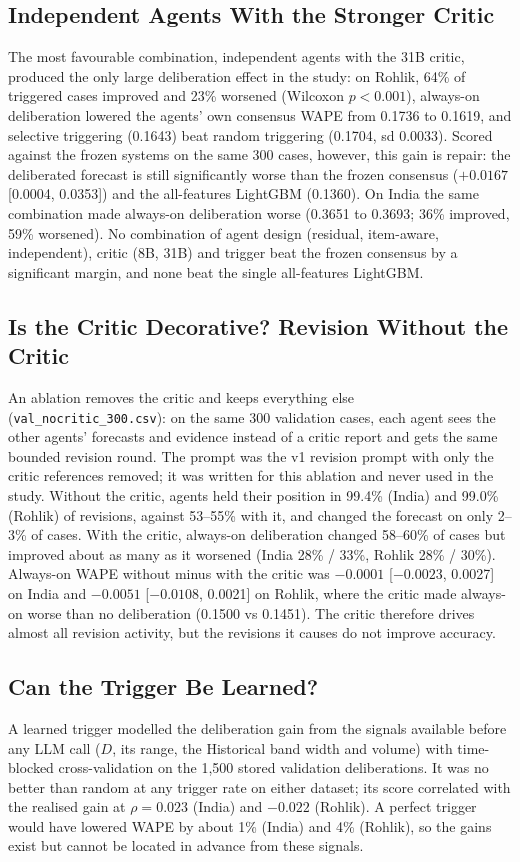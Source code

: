 \documentclass[conference]{IEEEtran}
\begin{document}
\subsection{Independent Agents With the Stronger Critic}
The most favourable combination, independent agents with the 31B critic, produced the only large
deliberation effect in the study: on Rohlik, 64\% of triggered cases improved and 23\% worsened
(Wilcoxon $p<0.001$), always-on deliberation lowered the agents' own consensus WAPE from 0.1736 to
0.1619, and selective triggering (0.1643) beat random triggering (0.1704, sd 0.0033). Scored against
the frozen systems on the same 300 cases, however, this gain is repair: the deliberated forecast is
still significantly worse than the frozen consensus ($+0.0167$ [0.0004, 0.0353]) and the
all-features LightGBM (0.1360). On India the same combination made always-on deliberation worse
(0.3651 to 0.3693; 36\% improved, 59\% worsened). No combination of agent design (residual,
item-aware, independent), critic (8B, 31B) and trigger beat the frozen consensus by a significant
margin, and none beat the single all-features LightGBM.

\subsection{Is the Critic Decorative? Revision Without the Critic}
An ablation removes the critic and keeps everything else (\texttt{val\_nocritic\_300.csv}): on the
same 300 validation cases, each agent sees the other agents' forecasts and evidence instead of a
critic report and gets the same bounded revision round. The prompt was the v1 revision prompt with
only the critic references removed; it was written for this ablation and never used in the study. Without the critic, agents
held their position in 99.4\% (India) and 99.0\% (Rohlik) of revisions, against 53--55\% with it,
and changed the forecast on only 2--3\% of cases. With the critic, always-on deliberation changed
58--60\% of cases but improved about as many as it worsened (India 28\% / 33\%, Rohlik 28\% / 30\%).
Always-on WAPE without minus with the critic was $-0.0001$ [$-0.0023$, 0.0027] on India and
$-0.0051$ [$-0.0108$, 0.0021] on Rohlik, where the critic made always-on worse than no deliberation
(0.1500 vs 0.1451). The critic therefore drives almost all revision activity, but the revisions it
causes do not improve accuracy.

\subsection{Can the Trigger Be Learned?}
A learned trigger modelled the deliberation gain from the signals available before any LLM call
($D$, its range, the Historical band width and volume) with time-blocked cross-validation on the
1,500 stored validation deliberations. It was no better than random at any trigger rate on either
dataset; its score correlated with the realised gain at $\rho=0.023$ (India) and $-0.022$ (Rohlik).
A perfect trigger would have lowered WAPE by about 1\% (India) and 4\% (Rohlik), so the gains exist
but cannot be located in advance from these signals.
\end{document}
